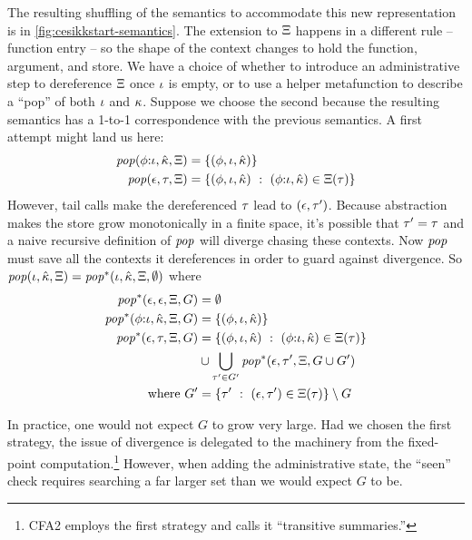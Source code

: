 The resulting shuffling of the semantics to accommodate this new representation is in \autoref{fig:cesikkstart-semantics}.
%
The extension to $\Xi$ happens in a different rule -- function entry -- so the shape of the context changes to hold the function, argument, and store.
%
We have a choice of whether to introduce an administrative step to dereference $\Xi$ once $\iota$ is empty, or to use a helper metafunction to describe a ``pop'' of both $\iota$ and $\kappa$.
%
Suppose we choose the second because the resulting semantics has a 1-to-1 correspondence with the previous semantics.
%
A first attempt might land us here:
\begin{align*}
  \mathit{pop}(\phi{\tt :} \iota,{\hat{\kappa}},\Xi) &= \{ (\phi,\iota,{\hat{\kappa}}) \} \\
  \mathit{pop}(\epsilon,\tau,\Xi) &= \{ (\phi,\iota,{\hat{\kappa}})\ :\ (\phi{\tt :} \iota, {\hat{\kappa}}) \in \Xi(\tau)\}
\end{align*}
However, tail calls make the dereferenced $\tau$ lead to $(\epsilon,\tau')$.
%
Because abstraction makes the store grow monotonically in a finite space, it's possible that $\tau' = \tau$ and a naive recursive definition of $\mathit{pop}$ will diverge chasing these contexts.
%
Now $\mathit{pop}$ must save all the contexts it dereferences in order to guard against divergence.
%
So $\mathit{pop}(\iota,{\hat{\kappa}},\Xi) = \mathit{pop}^*(\iota,{\hat{\kappa}},\Xi,\emptyset)$ where
\begin{align*}
  \mathit{pop}^*(\epsilon,\epsilon,\Xi,G) &= \emptyset \\
  \mathit{pop}^*(\phi{\tt :} \iota,{\hat{\kappa}},\Xi,G) &= \{ (\phi,\iota,{\hat{\kappa}}) \} \\
  \mathit{pop}^*(\epsilon,\tau,\Xi,G) &= \{ (\phi,\iota,{\hat{\kappa}})\ :\ (\phi{\tt :} \iota, {\hat{\kappa}}) \in \Xi(\tau)\} \\
  &\cup \bigcup\limits_{\tau' \in G'}\mathit{pop}^*(\epsilon,\tau',\Xi,G\cup G') \\
  \text{where } G' &= \{ \tau'\ :\ (\epsilon,\tau') \in \Xi(\tau)\} \setminus G
\end{align*}

In practice, one would not expect $G$ to grow very large.
%
Had we chosen the first strategy, the issue of divergence is delegated to the machinery from the fixed-point computation.\footnote{CFA2 employs the first strategy and calls it ``transitive summaries.''}
%
However, when adding the administrative state, the ``seen'' check requires searching a far larger set than we would expect $G$ to be.

